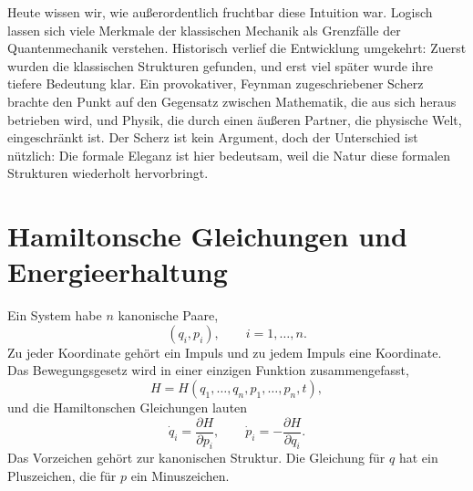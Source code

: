 Heute wissen wir, wie außerordentlich fruchtbar diese Intuition war. Logisch lassen sich viele Merkmale der klassischen Mechanik als Grenzfälle der Quantenmechanik verstehen. Historisch verlief die Entwicklung umgekehrt: Zuerst wurden die klassischen Strukturen gefunden, und erst viel später wurde ihre tiefere Bedeutung klar. Ein provokativer, Feynman zugeschriebener Scherz brachte den Punkt auf den Gegensatz zwischen Mathematik, die aus sich heraus betrieben wird, und Physik, die durch einen äußeren Partner, die physische Welt, eingeschränkt ist. Der Scherz ist kein Argument, doch der Unterschied ist nützlich: Die formale Eleganz ist hier bedeutsam, weil die Natur diese formalen Strukturen wiederholt hervorbringt.

\begin{classroomqa}
\end{classroomqa}

\section{Hamiltonsche Gleichungen und Energieerhaltung}

Ein System habe \(n\) kanonische Paare,
\begin{equation}
  (q_i,p_i),\qquad i=1,\ldots,n.
  \label{eq:l7-canonical-pairs}
\end{equation}
Zu jeder Koordinate gehört ein Impuls und zu jedem Impuls eine Koordinate. Das Bewegungsgesetz wird in einer einzigen Funktion zusammengefasst,
\begin{equation}
  H=H(q_1,\ldots,q_n,p_1,\ldots,p_n,t),
  \label{eq:l7-hamiltonian}
\end{equation}
und die Hamiltonschen Gleichungen lauten
\begin{equation}
  \boxed{
  \dot q_i=\frac{\partial H}{\partial p_i},
  \qquad
  \dot p_i=-\frac{\partial H}{\partial q_i}.}
  \label{eq:l7-hamilton-equations}
\end{equation}
Das Vorzeichen gehört zur kanonischen Struktur. Die Gleichung für \(q\) hat ein Pluszeichen, die für \(p\) ein Minuszeichen.

